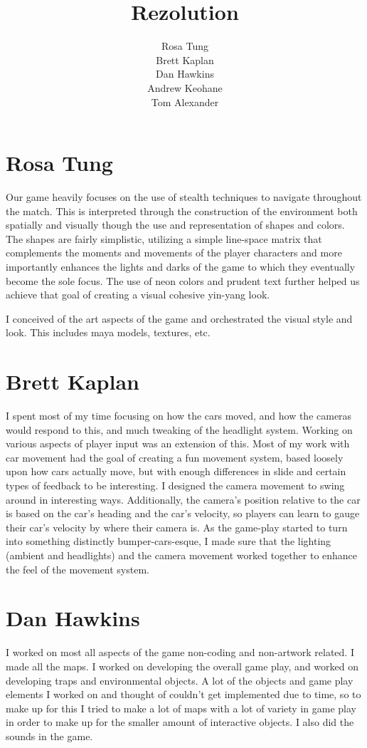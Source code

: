 \documentclass[12pt, letter]{article}
\title{Rezolution}
\date{}
\author{Rosa Tung\\
Brett Kaplan\\
Dan Hawkins\\
Andrew Keohane\\
Tom Alexander}
\begin{document}
\maketitle
\section*{Rosa Tung}
\hspace{0.25in}Our game heavily focuses on the use of stealth techniques to navigate throughout the match. This is interpreted through the construction of the environment both spatially and visually though the use and representation of shapes and colors. The shapes are fairly simplistic, utilizing a simple line-space matrix that complements the moments and movements of the player characters and more importantly enhances the lights and darks of the game to which they eventually become the sole focus. The use of neon colors and prudent text further helped us achieve that goal of creating a visual cohesive yin-yang look.

I conceived of the art aspects of the game and orchestrated the visual style and look. This includes maya models, textures, etc.
\section*{Brett Kaplan}
\hspace{0.25in}I spent most of my time focusing on how the cars moved, and how the cameras would respond to this, and much tweaking of the headlight system. Working on various aspects of player input was an extension of this. Most of my work with car movement had the goal of creating a fun movement system, based loosely upon how cars actually move, but with enough differences in slide and certain types of feedback to be interesting. I designed the camera movement to swing around in interesting ways. Additionally, the camera’s position relative to the car is based on the car’s heading and the car’s velocity, so players can learn to gauge their car’s velocity by where their camera is. As the game-play started to turn into something distinctly bumper-cars-esque, I made sure that the lighting (ambient and headlights) and the camera movement worked together to enhance the feel of the movement system.
\section*{Dan Hawkins}
\hspace{0.25in}I worked on most all aspects of the game non-coding and non-artwork related. I made all the maps. I worked on developing the overall game play, and worked on developing traps and environmental objects. A lot of the objects and game play elements I worked on and thought of couldn’t get implemented due to time, so to make up for this I tried to make a lot of maps with a lot of variety in game play in order to make up for the smaller amount of interactive objects. I also did the sounds in the game.
\end{document}
